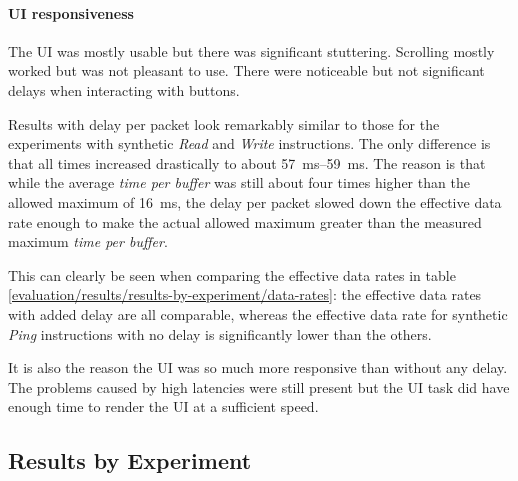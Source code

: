 \paragraph{UI responsiveness}

The UI was mostly usable but there was significant stuttering. Scrolling mostly worked but was not
pleasant to use. There were noticeable but not significant delays when interacting with buttons. 
\bigbreak

Results with delay per packet look remarkably similar to those for the experiments with synthetic
\textit{Read} and \textit{Write} instructions. The only difference is that all times increased
drastically to about \SIrange{57}{59}{\milli\second}. The reason is that while the average
\textit{time per buffer} was still about four times higher than the allowed maximum of
\SI{16}{\milli\second}, the delay per packet slowed down the effective data rate enough to make the
actual allowed maximum greater than the measured maximum \textit{time per buffer}.

This can clearly be seen when comparing the effective data rates in table \ref{evaluation/results/results-by-experiment/data-rates}:
the effective data rates with added delay are all comparable, whereas the effective data rate for
synthetic \textit{Ping} instructions with no delay is significantly lower than the others.

It is also the reason the UI was so much more responsive than without any delay. The problems caused
by high latencies were still present but the UI task did have enough time to render the UI at a
sufficient speed.

\clearpage
\subsection{Results by Experiment}
\label{evaluation/results/results-by-experiment}

